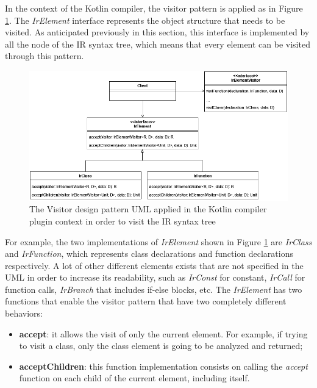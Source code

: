 In the context of the Kotlin compiler, the visitor pattern is applied as in Figure \ref{fig:visitor_uml_kotlin_compiler}. The \textit{IrElement} interface represents the object structure that needs to be visited. As anticipated previously in this section, this interface is implemented by all the node of the IR syntax tree, which means that every element can be visited through this pattern.
\begin{figure}[!ht]
    \centering
    \includegraphics[scale=0.55]{document/chapters/2-metaprogramming/images/visitor_uml_kotlin_compiler.png}
    \caption{The Visitor design pattern UML applied in the Kotlin compiler plugin context in order to visit the IR syntax tree}
    \label{fig:visitor_uml_kotlin_compiler}
\end{figure}
For example, the two implementations of \textit{IrElement} shown in Figure \ref{fig:visitor_uml_kotlin_compiler} are \textit{IrClass} and \textit{IrFunction}, which represents class declarations and function declarations respectively. A lot of other different elements exists that are not specified in the UML in order to increase its readability, such as \textit{IrConst} for constant, \textit{IrCall} for function calls, \textit{IrBranch} that includes if-else blocks, etc.\newline
The \textit{IrElement} has two functions that enable the visitor pattern that have two completely different behaviors:
\begin{itemize}
    \item \textbf{accept}: it allows the visit of only the current element. For example, if trying to visit a class, only the class element is going to be analyzed and returned;
    \item \textbf{acceptChildren}: this function implementation consists on calling the \textit{accept} function on each child of the current element, including itself.
\end{itemize}
